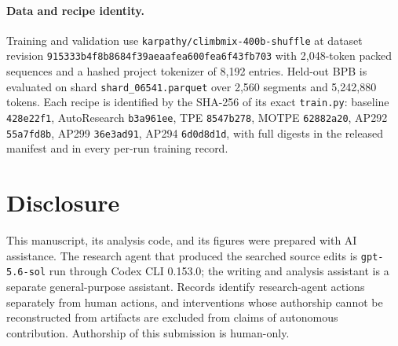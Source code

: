 \documentclass{article}
\begin{document}
\paragraph{Data and recipe identity.} Training and validation use \texttt{karpathy/climbmix-400b-shuffle} at dataset revision \texttt{915333b4f8b8684f39aeaafea600fea6f43fb703} with 2,048-token packed sequences and a hashed project tokenizer of 8,192 entries. Held-out BPB is evaluated on shard \texttt{shard\_06541.parquet} over 2,560 segments and 5,242,880 tokens. Each recipe is identified by the SHA-256 of its exact \texttt{train.py}: baseline \texttt{428e22f1}, AutoResearch \texttt{b3a961ee}, TPE \texttt{8547b278}, MOTPE \texttt{62882a20}, AP292 \texttt{55a7fd8b}, AP299 \texttt{36e3ad91}, AP294 \texttt{6d0d8d1d}, with full digests in the released manifest and in every per-run training record.

\section{Disclosure}
This manuscript, its analysis code, and its figures were prepared with AI assistance. The research agent that produced the searched source edits is \texttt{gpt-5.6-sol} run through Codex CLI 0.153.0; the writing and analysis assistant is a separate general-purpose assistant. Records identify research-agent actions separately from human actions, and interventions whose authorship cannot be reconstructed from artifacts are excluded from claims of autonomous contribution. Authorship of this submission is human-only.

\clearpage


\end{document}
